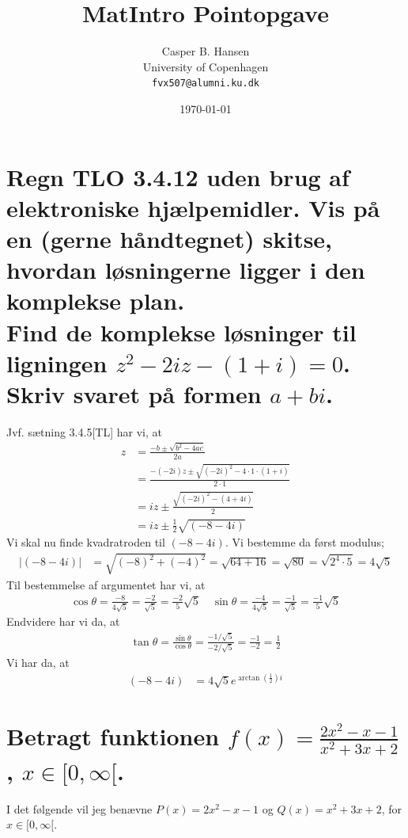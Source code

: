\documentclass[11pt,a4paper]{article}
\title{MatIntro Pointopgave \assignmentnumber}
\author
{
    Casper B. Hansen\\
    University of Copenhagen\\
    {\tt fvx507@alumni.ku.dk}
}
\date{\today}
\newcommand{\modulus}[1]{\lvert#1\rvert}
\begin{document}


\section
{
    \mdseries
    Regn TLO 3.4.12 uden brug af elektroniske hjælpemidler. Vis på en (gerne
    håndtegnet) skitse, hvordan løsningerne ligger i den komplekse plan.
    \\\indent
    Find de komplekse løsninger til ligningen $z^2 - 2iz - (1 + i) = 0$.
    Skriv svaret på formen $a + bi$.
}
Jvf. sætning 3.4.5[TL] har vi, at
\begin{align}
    z &= \frac{-b \pm \sqrt{b^2 - 4ac}}{2a} \\
      &= \frac{-(-2i)z \pm \sqrt{(-2i)^2 - 4 \cdot 1 \cdot (1 + i)}}{2 \cdot 1} \\
      &= iz \pm \frac{\sqrt{(-2i)^2 - (4 + 4i)}}{2} \\
      &= iz \pm \frac{1}{2} \sqrt{(-8 - 4i)}
\end{align}
Vi skal nu finde kvadratroden til $(-8 - 4i)$. Vi bestemme da først modulus;
\begin{align}
    \modulus{(-8 - 4i)} &= \sqrt{(-8)^2 + (-4)^2}
                         = \sqrt{64 + 16}
                         = \sqrt{80}
                         = \sqrt{2^4 \cdot 5}
                         = 4 \sqrt{5}
\end{align}
Til bestemmelse af argumentet har vi, at
\begin{align}
    \cos \theta = \frac{-8}{4 \sqrt{5}}
                = \frac{-2}{\sqrt{5}}
                = \frac{-2}{5} \sqrt{5}
    \quad
    \sin \theta = \frac{-4}{4 \sqrt{5}}
                = \frac{-1}{\sqrt{5}}
                = \frac{-1}{5} \sqrt{5}
\end{align}
Endvidere har vi da, at
\begin{align}
    \tan \theta = \frac{\sin \theta}{\cos \theta}
                = \frac{-1 / \sqrt{5}}{-2 / \sqrt{5}}
                = \frac{-1}{-2}
                = \frac{1}{2}
\end{align}
Vi har da, at
\begin{align}
    (-8 - 4i) &= 4 \sqrt{5} e^{\arctan(\frac{1}{2}) i}
\end{align}

\clearpage
\section
{
    \mdseries
    Betragt funktionen $f(x) = \frac{2x^2 - x - 1}{x^2 + 3x + 2}$, $x \in
    [0,\infty[$.
}
I det følgende vil jeg benævne $P(x) = 2x^2 - x - 1$ og
$Q(x) = x^2 + 3x + 2$, for $x \in [0,\infty[$.
\end{document}

